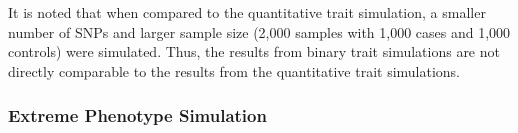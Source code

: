 \documentclass[12pt]{scrbook}
\begin{document}
It is noted that when compared to the quantitative trait simulation, a smaller number of \glspl{SNP} and larger sample size (2,000 samples with 1,000 cases and 1,000 controls) were simulated. 
Thus, the results from binary trait simulations are not directly comparable to the results from the quantitative trait simulations.

\subsubsection{Extreme Phenotype Simulation}
\begin{figure}
	\centering
\end{figure}
\end{document}
